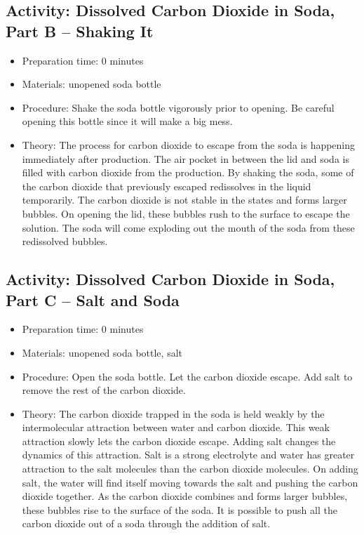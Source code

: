 \begin{itemize}
{\begin{itemize}
\begin{itemize}
{\subsection{Activity: Dissolved Carbon Dioxide in Soda, Part B – Shaking It}
\begin{itemize}
\item{Preparation time: 0 minutes}
\item{Materials: unopened soda bottle}
\item{Procedure: Shake the soda bottle vigorously prior to opening. Be careful opening this bottle since it will make a big mess.}
\item{Theory: The process for carbon dioxide to escape from the soda is happening immediately after production. The air pocket in between the lid and soda is filled with carbon dioxide from the production. By shaking the soda, some of the carbon dioxide that previously escaped redissolves in the liquid temporarily. The carbon dioxide is not stable in the states and forms larger bubbles. On opening the lid, these bubbles rush to the surface to escape the solution. The soda will come exploding out the mouth of the soda from these redissolved bubbles. }
\end{itemize}

\subsection{Activity: Dissolved Carbon Dioxide in Soda, Part C – Salt and Soda}
\begin{itemize}
\item{Preparation time: 0 minutes}
\item{Materials: unopened soda bottle, salt}
\item{Procedure: Open the soda bottle. Let the carbon dioxide escape. Add salt to remove the rest of the carbon dioxide.}
\item{Theory: The carbon dioxide trapped in the soda is held weakly by the intermolecular attraction between water and carbon dioxide. This weak attraction slowly lets the carbon dioxide escape. Adding salt changes the dynamics of this attraction. Salt is a strong electrolyte and water has greater attraction to the salt molecules than the carbon dioxide molecules. On adding salt, the water will find itself moving towards the salt and pushing the carbon dioxide together. As the carbon dioxide combines and forms larger bubbles, these bubbles rise to the surface of the soda. It is possible to push all the carbon dioxide out of a soda through the addition of salt.}
\end{itemize}

}
\end{itemize}
\end{itemize}}
\end{itemize}

